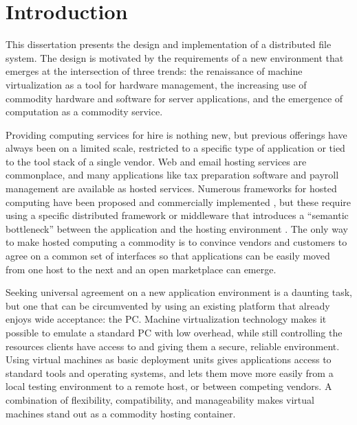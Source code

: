 \chapter{Introduction}

This dissertation presents the design and implementation of a distributed file system. The design is motivated by the requirements of a new environment that emerges at the intersection of three trends: the renaissance of machine virtualization as a tool for hardware management, the increasing use of commodity hardware and software for server applications, and the emergence of computation as a commodity service.

Providing computing services for hire is nothing new, but previous offerings have always been on a limited scale, restricted to a specific type of application or tied to the tool stack of a single vendor. Web and email hosting services are commonplace, and many applications like tax preparation software and payroll management are available as hosted services. Numerous frameworks for hosted computing have been proposed \cite{amir,vahdat,tullmann} and commercially implemented \cite{amazon,sungrid,kallahalla}, but these require using a specific distributed framework or middleware that introduces a ``semantic bottleneck'' between the application and the hosting environment \cite{roscoe00}. The only way to make hosted computing a commodity is to convince vendors and customers to agree on a common set of interfaces so that applications can be easily moved from one host to the next and an open marketplace can emerge.

Seeking universal agreement on a new application environment is a daunting task, but one that can be circumvented by using an existing platform that already enjoys wide acceptance: the PC. Machine virtualization technology makes it possible to emulate a standard PC with low overhead, while still controlling the resources clients have access to and giving them a secure, reliable environment. Using virtual machines as basic deployment units gives applications access to standard tools and operating systems, and lets them move more easily from a local testing environment to a remote host, or between competing vendors. A combination of flexibility, compatibility, and manageability makes virtual machines stand out as a commodity hosting container.

